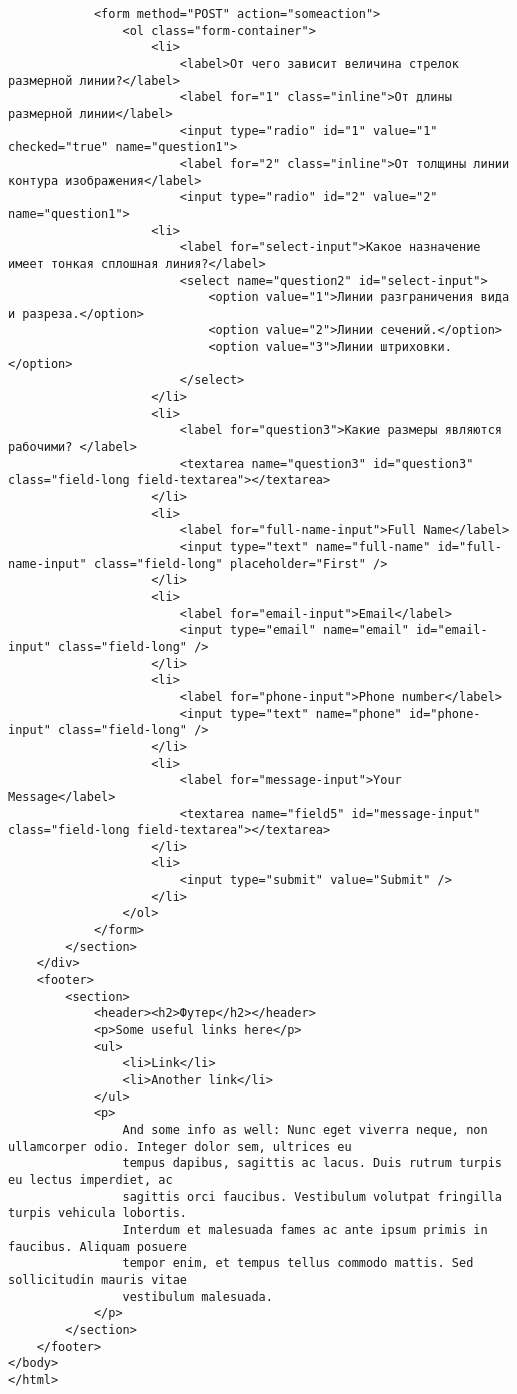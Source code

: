 \begin{lstlisting}
            <form method="POST" action="someaction">
                <ol class="form-container">
                    <li>
                        <label>От чего зависит величина стрелок размерной линии?</label>
                        <label for="1" class="inline">От длины размерной линии</label>
                        <input type="radio" id="1" value="1" checked="true" name="question1">
                        <label for="2" class="inline">От толщины линии  контура изображения</label>
                        <input type="radio" id="2" value="2" name="question1">
                    <li>
                        <label for="select-input">Какое назначение имеет тонкая сплошная линия?</label>
                        <select name="question2" id="select-input">
                            <option value="1">Линии разграничения вида и разреза.</option>
                            <option value="2">Линии сечений.</option>
                            <option value="3">Линии штриховки.</option>
                        </select>
                    </li>
                    <li>
                        <label for="question3">Какие размеры являются рабочими? </label>
                        <textarea name="question3" id="question3" class="field-long field-textarea"></textarea>
                    </li>
                    <li>
                        <label for="full-name-input">Full Name</label>
                        <input type="text" name="full-name" id="full-name-input" class="field-long" placeholder="First" />
                    </li>
                    <li>
                        <label for="email-input">Email</label>
                        <input type="email" name="email" id="email-input" class="field-long" />
                    </li>
                    <li>
                        <label for="phone-input">Phone number</label>
                        <input type="text" name="phone" id="phone-input" class="field-long" />
                    </li>
                    <li>
                        <label for="message-input">Your Message</label>
                        <textarea name="field5" id="message-input" class="field-long field-textarea"></textarea>
                    </li>
                    <li>
                        <input type="submit" value="Submit" />
                    </li>
                </ol>
            </form>
        </section>
    </div>
    <footer>
        <section>
            <header><h2>Футер</h2></header>
            <p>Some useful links here</p>
            <ul>
                <li>Link</li>
                <li>Another link</li>
            </ul>
            <p>
                And some info as well: Nunc eget viverra neque, non ullamcorper odio. Integer dolor sem, ultrices eu
                tempus dapibus, sagittis ac lacus. Duis rutrum turpis eu lectus imperdiet, ac
                sagittis orci faucibus. Vestibulum volutpat fringilla turpis vehicula lobortis.
                Interdum et malesuada fames ac ante ipsum primis in faucibus. Aliquam posuere 
                tempor enim, et tempus tellus commodo mattis. Sed sollicitudin mauris vitae 
                vestibulum malesuada. 
            </p>
        </section>
    </footer>
</body>
</html>
\end{lstlisting}

